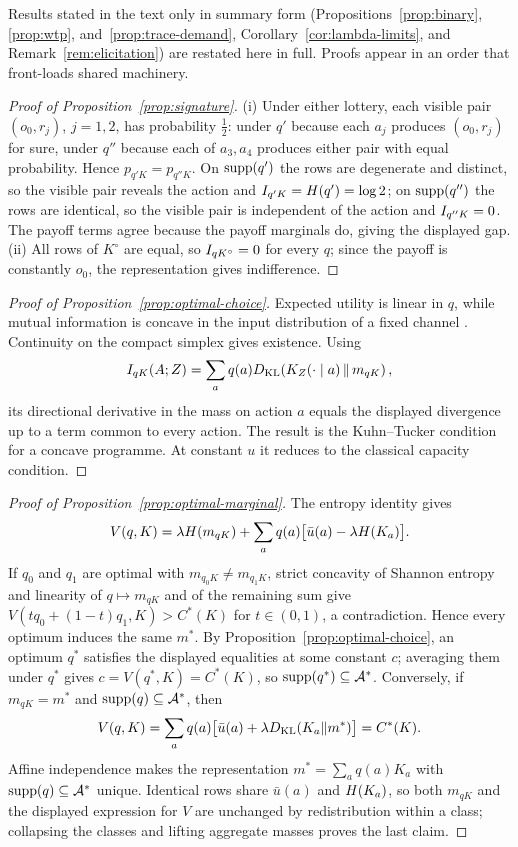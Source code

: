 Results stated in the text only in summary form (Propositions~\ref{prop:binary}, \ref{prop:wtp},
and~\ref{prop:trace-demand}, Corollary~\ref{cor:lambda-limits}, and Remark~\ref{rem:elicitation}) are restated here
in full.  Proofs appear in an order that front-loads shared machinery.

\begin{proof}[Proof of Proposition~\ref{prop:signature}]
(i) Under either lottery, each visible pair $(o_0,r_j)$, $j=1,2$, has probability $\tfrac12$: under $q'$ because
each $a_j$ produces $(o_0,r_j)$ for sure, under $q''$ because each of $a_3,a_4$ produces either pair with equal
probability.  Hence $p_{q'K}=p_{q''K}$.  On $\operatorname{supp}(q')$ the rows are degenerate and distinct, so the visible pair
reveals the action and $I_{q'K}=H(q')=\log2$; on $\operatorname{supp}(q'')$ the rows are identical, so the visible pair is
independent of the action and $I_{q''K}=0$.  The payoff terms agree because the payoff marginals do, giving the
displayed gap.
(ii) All rows of $K^\circ$ are equal, so $I_{qK^\circ}=0$ for every $q$; since the payoff is constantly $o_0$,
the representation gives indifference.
\end{proof}

\begin{proof}[Proof of Proposition~\ref{prop:optimal-choice}]
Expected utility is linear in $q$, while mutual information is concave in the input distribution of a fixed channel
\cite{CoverThomas2006}.  Continuity on the compact simplex gives existence.  Using
\[
 I_{qK}(A;Z)=\sum_aq(a)D_{\mathrm{KL}}\!\left(K_Z(\cdot\mid a)\,\middle\|\,m_{qK}\right),
\]
its directional derivative in the mass on action $a$ equals the displayed divergence up to a term common to every
action.  The result is the Kuhn--Tucker condition for a concave programme.  At constant $u$ it reduces to the classical
capacity condition.
\end{proof}

\begin{proof}[Proof of Proposition~\ref{prop:optimal-marginal}]
The entropy identity gives
\[
 V(q,K)
 =\lambda H(m_{qK})
  +\sum_aq(a)\bigl[\bar u(a)-\lambda H(K_a)\bigr].
\]
If $q_0$ and $q_1$ are optimal with $m_{q_0K}\ne m_{q_1K}$, strict concavity of Shannon entropy and linearity of
$q\mapsto m_{qK}$ and of the remaining sum give $V(tq_0+(1-t)q_1,K)>C^*(K)$ for $t\in(0,1)$, a contradiction.
Hence every optimum induces the same $m^*$.  By Proposition~\ref{prop:optimal-choice}, an optimum $q^*$ satisfies
the displayed equalities at some constant $c$; averaging them under $q^*$ gives $c=V(q^*,K)=C^*(K)$, so
$\operatorname{supp}(q^*)\subseteq\mathcal A^*$.  Conversely, if $m_{qK}=m^*$ and $\operatorname{supp}(q)\subseteq\mathcal A^*$, then
\[
 V(q,K)
 =\sum_aq(a)\bigl[\bar u(a)+\lambda D_{\mathrm{KL}}(K_a\|m^*)\bigr]
 =C^*(K).
\]
Affine independence makes the representation $m^*=\sum_aq(a)K_a$ with $\operatorname{supp}(q)\subseteq\mathcal A^*$ unique.
Identical rows share $\bar u(a)$ and $H(K_a)$, so both $m_{qK}$ and the displayed expression for $V$ are
unchanged by redistribution within a class; collapsing the classes and lifting aggregate masses proves the last
claim.
\end{proof}

